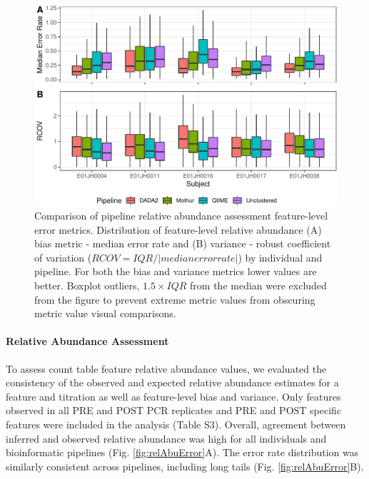\documentclass{bmcart}
\begin{document}
\begin{figure}
\centering
\includegraphics{relAbuErrorMetrics-1.pdf}
\caption{\label{fig:relAbuErrorMetrics}Comparison of pipeline relative
abundance assessment feature-level error metrics. Distribution of
feature-level relative abundance (A) bias metric - median error rate and
(B) variance - robust coefficient of variation (\(RCOV=IQR/|median error rate|\)) by individual and pipeline.
For both the bias and variance metrics lower values are better.
Boxplot outliers, \(1.5\times IQR\) from the median were excluded from the figure to prevent extreme metric values
from obscuring metric value visual comparisons.}
\end{figure}


\paragraph{Relative Abundance Assessment}
To assess count table feature relative abundance values, we evaluated the consistency of
the observed and expected relative abundance estimates for a feature and
titration as well as feature-level bias and variance.
Only features observed in all PRE and POST PCR replicates
and PRE and POST specific features were included in the analysis (Table S3). Overall, agreement between inferred
and observed relative abundance was high for all individuals and
bioinformatic pipelines (Fig. \ref{fig:relAbuError}A). The error rate
distribution was similarly consistent across pipelines, including long
tails (Fig. \ref{fig:relAbuError}B).
\end{document}
